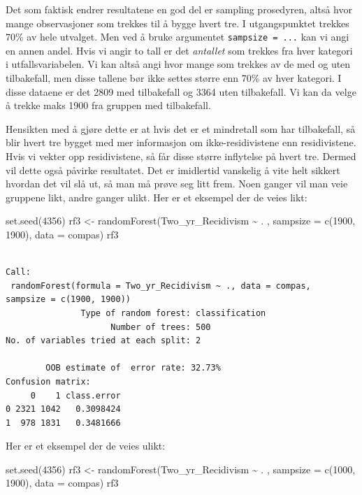 \documentclass[
  letterpaper,
  DIV=11,
  numbers=noendperiod]{scrreprt}
\newenvironment{Shaded}{\begin{snugshade}}{\end{snugshade}}
\newcommand{\AttributeTok}[1]{\textcolor[rgb]{0.40,0.45,0.13}{#1}}
\newcommand{\DecValTok}[1]{\textcolor[rgb]{0.68,0.00,0.00}{#1}}
\newcommand{\FunctionTok}[1]{\textcolor[rgb]{0.28,0.35,0.67}{#1}}
\newcommand{\NormalTok}[1]{\textcolor[rgb]{0.00,0.23,0.31}{#1}}
\newcommand{\OtherTok}[1]{\textcolor[rgb]{0.00,0.23,0.31}{#1}}
\newcommand{\SpecialCharTok}[1]{\textcolor[rgb]{0.37,0.37,0.37}{#1}}
\theoremstyle{definition}
\theoremstyle{remark}
\begin{document}
Det som faktisk endrer resultatene en god del er sampling prosedyren,
altså hvor mange observasjoner som trekkes til å bygge hvert tre. I
utgangspunktet trekkes 70\% av hele utvalget. Men ved å bruke argumentet
\texttt{sampsize\ =\ ...} kan vi angi en annen andel. Hvis vi angir to
tall er det \emph{antallet} som trekkes fra hver kategori i
utfallsvariabelen. Vi kan altså angi hvor mange som trekkes av de med og
uten tilbakefall, men disse tallene bør ikke settes større enn 70\% av
hver kategori. I disse dataene er det 2809 med tilbakefall og 3364 uten
tilbakefall. Vi kan da velge å trekke maks 1900 fra gruppen med
tilbakefall.

Hensikten med å gjøre dette er at hvis det er et mindretall som har
tilbakefall, så blir hvert tre bygget med mer informasjon om
ikke-residivistene enn residivistene. Hvis vi vekter opp residivistene,
så får disse større inflytelse på hvert tre. Dermed vil dette også
påvirke resultatet. Det er imidlertid vanskelig å vite helt sikkert
hvordan det vil slå ut, så man må prøve seg litt frem. Noen ganger vil
man veie gruppene likt, andre ganger ulikt. Her er et eksempel der de
veies likt:

\begin{Shaded}
\begin{Highlighting}[]
\FunctionTok{set.seed}\NormalTok{(}\DecValTok{4356}\NormalTok{)}
\NormalTok{rf3 }\OtherTok{\textless{}{-}} \FunctionTok{randomForest}\NormalTok{(Two\_yr\_Recidivism }\SpecialCharTok{\textasciitilde{}}\NormalTok{ . , }
                    \AttributeTok{sampsize =} \FunctionTok{c}\NormalTok{(}\DecValTok{1900}\NormalTok{, }\DecValTok{1900}\NormalTok{),}
                    \AttributeTok{data =}\NormalTok{ compas)}
\NormalTok{rf3}
\end{Highlighting}
\end{Shaded}

\begin{verbatim}

Call:
 randomForest(formula = Two_yr_Recidivism ~ ., data = compas,      sampsize = c(1900, 1900)) 
               Type of random forest: classification
                     Number of trees: 500
No. of variables tried at each split: 2

        OOB estimate of  error rate: 32.73%
Confusion matrix:
     0    1 class.error
0 2321 1042   0.3098424
1  978 1831   0.3481666
\end{verbatim}

Her er et eksempel der de veies ulikt:

\begin{Shaded}
\begin{Highlighting}[]
\FunctionTok{set.seed}\NormalTok{(}\DecValTok{4356}\NormalTok{)}
\NormalTok{rf3 }\OtherTok{\textless{}{-}} \FunctionTok{randomForest}\NormalTok{(Two\_yr\_Recidivism }\SpecialCharTok{\textasciitilde{}}\NormalTok{ . , }
                    \AttributeTok{sampsize =} \FunctionTok{c}\NormalTok{(}\DecValTok{1000}\NormalTok{, }\DecValTok{1900}\NormalTok{),}
                   \AttributeTok{data =}\NormalTok{ compas)}
\NormalTok{rf3}
\end{Highlighting}
\end{Shaded}
\end{document}
